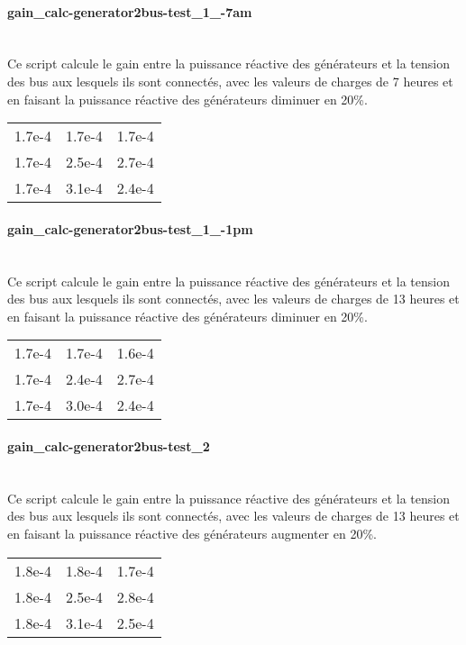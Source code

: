 \documentclass[a4paper,twoside]{article}
\begin{document}
\paragraph{gain\_calc-generator2bus-test\_1\_-7am\\\\}
Ce script calcule le gain entre la puissance réactive des générateurs et la tension des bus aux lesquels ils sont connectés, avec les valeurs de charges de 7 heures et en faisant la puissance réactive des générateurs diminuer en 20\%.

\begin{tabular}{ccc}
	1.7e-4&1.7e-4&1.7e-4\\
	1.7e-4&2.5e-4&2.7e-4\\
	1.7e-4&3.1e-4&2.4e-4\\
\end{tabular}

\paragraph{gain\_calc-generator2bus-test\_1\_-1pm\\\\}
Ce script calcule le gain entre la puissance réactive des générateurs et la tension des bus aux lesquels ils sont connectés, avec les valeurs de charges de 13 heures et en faisant la puissance réactive des générateurs diminuer en 20\%.

\begin{tabular}{ccc}
	1.7e-4&1.7e-4&1.6e-4\\
	1.7e-4&2.4e-4&2.7e-4\\
	1.7e-4&3.0e-4&2.4e-4\\
\end{tabular}
\paragraph{gain\_calc-generator2bus-test\_2\\\\}
Ce script calcule le gain entre la puissance réactive des générateurs et la tension des bus aux lesquels ils sont connectés, avec les valeurs de charges de 13 heures et en faisant la puissance réactive des générateurs augmenter en 20\%.

\begin{tabular}{ccc}
	
	1.8e-4&1.8e-4&1.7e-4\\
	
	1.8e-4&2.5e-4&2.8e-4\\
	
	1.8e-4&3.1e-4&2.5e-4\\
\end{tabular}
\end{document}
